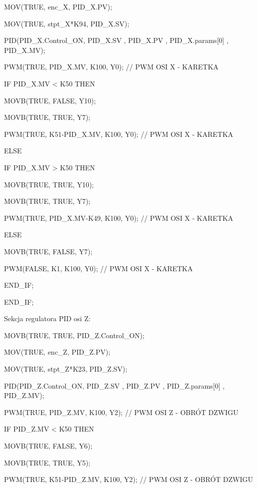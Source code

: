\documentclass{mwrep}
\begin{document}
\quad MOV(TRUE, enc\_X, PID\_X.PV);

\quad MOV(TRUE, stpt\_X*K94, PID\_X.SV);

\quad PID(PID\_X.Control\_ON, PID\_X.SV , PID\_X.PV , PID\_X.params[0] , PID\_X.MV); 

\quad PWM(TRUE, PID\_X.MV, K100, Y0); // PWM OSI X - KARETKA				
	
\quad IF PID\_X.MV < K50 THEN

\quad \quad MOVB(TRUE, FALSE, Y10);

\quad \quad MOVB(TRUE, TRUE, Y7);

\quad \quad PWM(TRUE, K51-PID\_X.MV, K100, Y0); // PWM OSI X - KARETKA		
	
\quad ELSE 

\quad \quad IF PID\_X.MV > K50 THEN

\quad \quad \quad MOVB(TRUE, TRUE, Y10);

\quad \quad \quad MOVB(TRUE, TRUE, Y7);

\quad \quad \quad PWM(TRUE, PID\_X.MV-K49, K100, Y0); // PWM OSI X - KARETKA	
	
\quad \quad \quad ELSE	

\quad \quad \quad MOVB(TRUE, FALSE, Y7);

\quad \quad \quad PWM(FALSE, K1, K100, Y0); // PWM OSI X - KARETKA	

\quad \quad END\_IF;

\quad END\_IF;

\vspace{1cm}

Sekcja regulatora PID osi Z:

\vspace{0.3cm}

\quad MOVB(TRUE, TRUE, PID\_Z.Control\_ON);

\quad MOV(TRUE, enc\_Z, PID\_Z.PV);

\quad MOV(TRUE, stpt\_Z*K23, PID\_Z.SV);

\quad PID(PID\_Z.Control\_ON, PID\_Z.SV , PID\_Z.PV , PID\_Z.params[0] , PID\_Z.MV); 

\quad PWM(TRUE, PID\_Z.MV, K100, Y2); // PWM OSI Z - OBRÓT DZWIGU				
	
\quad IF PID\_Z.MV < K50 THEN

\quad \quad MOVB(TRUE, FALSE, Y6);

\quad \quad MOVB(TRUE, TRUE, Y5);

\quad \quad PWM(TRUE, K51-PID\_Z.MV, K100, Y2); // PWM OSI Z - OBRÓT DZWIGU			
\end{document}
